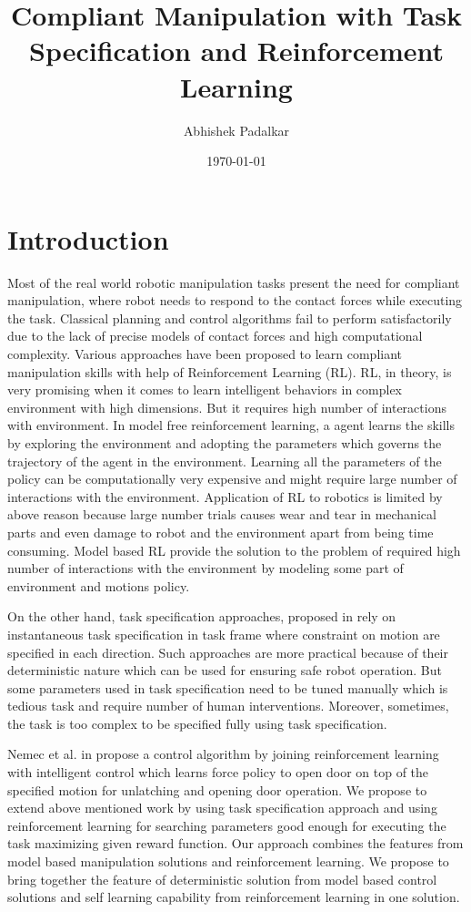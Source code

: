 \documentclass[thesis]{mas_proposal}
\title{Compliant Manipulation with Task Specification and Reinforcement Learning}
\author{Abhishek Padalkar}
\date{\today}
\begin{document}
\maketitle

\pagestyle{plain}

\chapter{Introduction}
Most of the real world robotic manipulation tasks present the need for compliant manipulation, where robot needs to respond to the contact forces while executing the task. Classical planning and control algorithms fail to perform satisfactorily due to the lack of precise models of contact forces and high computational complexity. Various approaches have been proposed to learn compliant manipulation skills with help of Reinforcement Learning (RL). RL, in theory, is very promising when it comes to learn intelligent behaviors in complex environment with high dimensions. But it requires high number of interactions with environment. In model free reinforcement learning, a agent learns the skills by exploring the environment and adopting the parameters which governs the trajectory of the agent in the environment. Learning all the parameters of the policy can be computationally very expensive and might require large number of interactions with the environment. Application of RL to robotics is limited by above reason because large number trials causes wear and tear in mechanical parts and even damage to robot and the environment apart from being time consuming. Model based RL provide the solution to the problem of required high number of interactions with the environment by modeling some part of environment and motions policy. 

On the other hand, task specification approaches, proposed in \cite{leidner2017cognitive,mason1981compliance,bruyninckx1996specification} rely on instantaneous task specification in task frame where constraint on motion are specified in each direction. Such approaches are more practical because of their deterministic nature which can be used for ensuring safe robot operation. But some parameters used in task specification need to be tuned manually which is tedious task and require number of human interventions. Moreover, sometimes, the task is too complex to be specified fully using task specification. 

Nemec et al. in \cite{nemec2017door} propose a control algorithm by joining reinforcement learning with intelligent control which learns force policy to open door on top of the specified motion for unlatching and opening door operation.
We propose to extend above mentioned work by using task specification approach and using reinforcement learning for searching parameters good enough for executing the task maximizing given reward function. Our approach combines the features from model based manipulation solutions and reinforcement learning. We propose to bring together the feature of deterministic solution from model based control solutions and self learning capability from reinforcement learning in one solution.  
\end{document}
